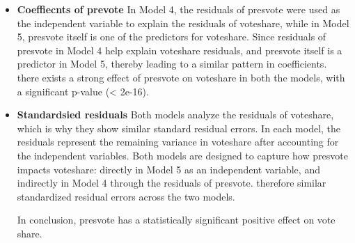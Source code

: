 \documentclass[12pt,letterpaper]{article}
\begin{document}
\begin{enumerate}
\begin{itemize}
			\vspace{0.2cm}
			\item\textbf{Coeffiecnts of prevote}
			\newline
			In Model 4, the residuals of presvote were used as the independent variable to explain the residuals of voteshare, while in Model 5, presvote itself is one of the predictors for voteshare. Since residuals of presvote in Model 4 help explain voteshare residuals, and presvote itself is a predictor in Model 5, thereby leading to a similar pattern in coefficients. there exists a strong effect of presvote on voteshare in both the models, with a significant p-value (< 2e-16).
			\vspace{0.2cm}
			\item \textbf{Standardsied residuals }
			\newline
			Both models analyze the residuals of voteshare, which is why they show similar standard residual errors. In each model, the residuals represent the remaining variance in voteshare after accounting for the independent variables. Both models are designed to capture how presvote impacts voteshare: directly in Model 5 as an independent variable, and indirectly in Model 4 through the residuals of presvote. therefore similar standardized residual errors across the two models.
			
			In conclusion, presvote has a statistically significant positive effect on vote share.
			
		\end{itemize}
			
		
		 
	\end{enumerate}
\end{document}
